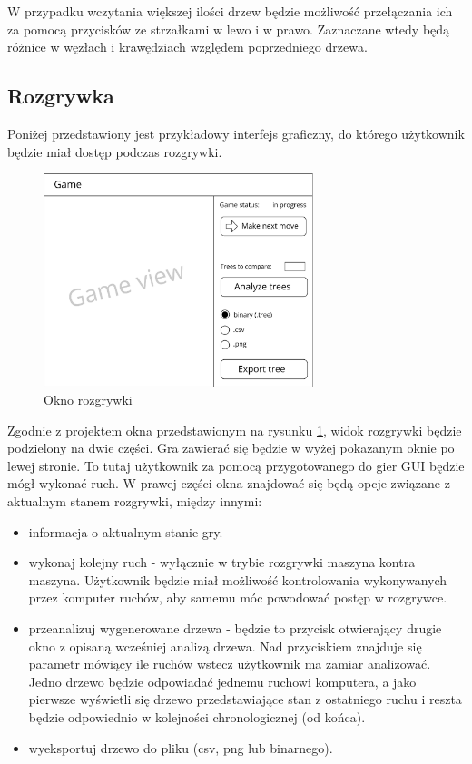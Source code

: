 \documentclass{article}
\begin{document}
	\noindent W przypadku wczytania większej ilości drzew będzie możliwość przełączania ich za pomocą przycisków ze strzałkami w lewo i w prawo. Zaznaczane wtedy będą różnice w węzłach i krawędziach względem poprzedniego drzewa.
	
	\clearpage
	
	\subsection{Rozgrywka}
	Poniżej przedstawiony jest przykładowy interfejs graficzny, do którego użytkownik będzie miał dostęp podczas rozgrywki.
	\begin{figure}[h!]
		\centering
		\includegraphics[width=0.7\textwidth]{game-eps-improved}
		\caption{Okno rozgrywki}
		\label{rys:game_view}
	\end{figure}

	\noindent Zgodnie z projektem okna przedstawionym na rysunku \ref{rys:game_view}, widok rozgrywki będzie podzielony na dwie części. Gra zawierać się będzie w wyżej pokazanym oknie po lewej stronie. To tutaj użytkownik za pomocą przygotowanego do gier GUI będzie mógł wykonać ruch. W prawej części okna znajdować się będą opcje związane z aktualnym stanem rozgrywki, między innymi:\\
	
	\begin{itemize}
		\item informacja o aktualnym stanie gry.
		\item wykonaj kolejny ruch - wyłącznie w trybie rozgrywki maszyna kontra maszyna. Użytkownik będzie miał możliwość kontrolowania wykonywanych przez komputer ruchów, aby samemu móc powodować postęp w rozgrywce.
		\item przeanalizuj wygenerowane drzewa - będzie to przycisk otwierający drugie okno z opisaną wcześniej analizą drzewa. Nad przyciskiem znajduje się parametr mówiący ile ruchów wstecz użytkownik ma zamiar analizować. Jedno drzewo będzie odpowiadać jednemu ruchowi komputera, a jako pierwsze wyświetli się drzewo przedstawiające stan z ostatniego ruchu i reszta będzie odpowiednio w kolejności chronologicznej (od końca).
		\item wyeksportuj drzewo do pliku (csv, png lub binarnego).
	\end{itemize}
	
\end{document}
